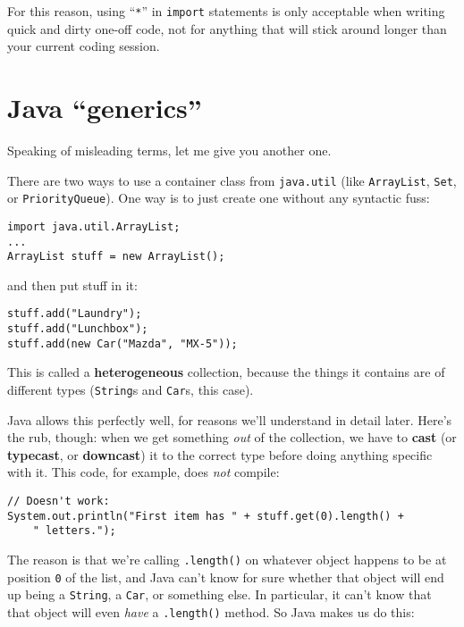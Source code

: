 For this reason, using ``\texttt{*}'' in \texttt{import} statements is only
acceptable when writing quick and dirty one-off code, not for anything that
will stick around longer than your current coding session.



\section{Java ``generics''}

Speaking of misleading terms, let me give you another one.

There are two ways to use a container class from \texttt{java.util} (like
\texttt{ArrayList}, \texttt{Set}, or \texttt{PriorityQueue}). One way is to
just create one without any syntactic fuss:

\begin{Verbatim}[fontsize=\small,samepage=true,frame=single]
import java.util.ArrayList;
...
ArrayList stuff = new ArrayList();
\end{Verbatim}

and then put stuff in it:

\begin{Verbatim}[fontsize=\small,samepage=true,frame=single]
stuff.add("Laundry");
stuff.add("Lunchbox");
stuff.add(new Car("Mazda", "MX-5"));
\end{Verbatim}

This is called a \textbf{heterogeneous} collection, because the things it
contains are of different types (\texttt{String}s and \texttt{Car}s, this
case).

Java allows this perfectly well, for reasons we'll understand in detail later.
Here's the rub, though: when we get something \textit{out} of the collection,
we have to \textbf{cast} (or \textbf{typecast}, or \textbf{downcast}) it to
the correct type before doing anything specific with it. This code, for
example, does \textit{not} compile:

\begin{Verbatim}[fontsize=\small,samepage=true]
// Doesn't work:
System.out.println("First item has " + stuff.get(0).length() +
    " letters.");
\end{Verbatim}

The reason is that we're calling \texttt{.length()} on whatever object happens
to be at position \texttt{0} of the list, and Java can't know for sure whether
that object will end up being a \texttt{String}, a \texttt{Car}, or something
else. In particular, it can't know that that object will even \textit{have} a
\texttt{.length()} method. So Java makes us do this:

